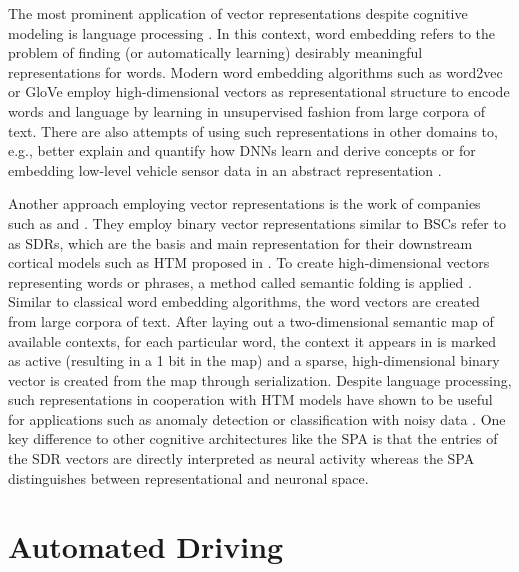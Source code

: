 The most prominent application of vector representations despite cognitive modeling \parencite{Blouw2016, Crawford2016, Eliasmith2012} is language processing \parencite{Gayler2003}.
In this context, word embedding refers to the problem of finding (or automatically learning) desirably meaningful representations for words.
Modern word embedding algorithms such as word2vec \parencite{Mikolov2013, Mikolov2013b} or \ac{GloVe} \parencite{Pennington2014} employ high-dimensional vectors as representational structure to encode words and language by learning in unsupervised fashion from large corpora of text.
There are also attempts of using such representations in other domains to, e.g., better explain and quantify how \acp{DNN} learn and derive concepts \parencite{Fong2018} or for embedding low-level vehicle sensor data in an abstract representation \parencite{Hallac2018}.

Another approach employing vector representations is the work of companies such as \textcite{Numenta} and \textcite{Cortialio}.
They employ binary vector representations similar to \acp{BSC} \textcite{Ahmad2015} refer to as \acp{SDR}, which are the basis and main representation for their downstream cortical models such as \ac{HTM} proposed in \textcite{Cui2017}.
To create high-dimensional vectors representing words or phrases, a method called semantic folding is applied \parencite{Webber2016}.
Similar to classical word embedding algorithms, the word vectors are created from large corpora of text.
After laying out a two-dimensional semantic map of available contexts, for each particular word, the context it appears in is marked as active (resulting in a \num{1} bit in the map) and a sparse, high-dimensional binary vector is created from the map through serialization.
Despite language processing, such representations in cooperation with \ac{HTM} models have shown to be useful for applications such as anomaly detection \parencite{Ahmad2017} or classification with noisy data \parencite{Ahmad2019}. 
One key difference to other cognitive architectures like the \ac{SPA} is that the entries of the \ac{SDR} vectors are directly interpreted as neural activity whereas the \ac{SPA} distinguishes between representational and neuronal space.

\section{Automated Driving}
\label{sec:automated_driving}

